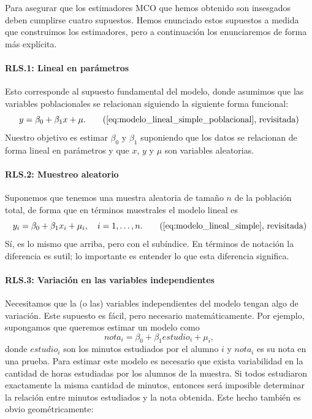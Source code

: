 \documentclass[12pt]{report}\usepackage[]{graphicx}\usepackage[]{color}
\begin{document}
Para asegurar que los estimadores MCO que hemos obtenido son insesgados deben cumplirse cuatro supuestos.
Hemos enunciado estos supuestos a medida que construimos los estimadores, pero a continuación los enunciaremos de forma más explícita.

\paragraph{RLS.1: Lineal en parámetros} Esto corresponde al supuesto fundamental del modelo, donde asumimos que las variables poblacionales se relacionan siguiendo la siguiente forma funcional:
\begin{equation}
y = \beta_0 + \beta_1 x + \mu. \tag{\ref{eq:modelo_lineal_simple_poblacional}, revisitada}
\end{equation}
Nuestro objetivo es estimar $\beta_0$ y $\beta_1$ suponiendo que los datos se relacionan de forma lineal en parámetros y que $x$, $y$ y $\mu$ son variables aleatorias.

\paragraph{RLS.2: Muestreo aleatorio} Suponemos que tenemos una muestra aleatoria de tamaño $n$ de la población total, de forma que en términos muestrales el modelo lineal es
\begin{equation}
y_i = \beta_0 + \beta_1 x_i + \mu_i, \quad i = 1,\ldots,n. \tag{\ref{eq:modelo_lineal_simple}, revisitada}
\end{equation}
Sí, es lo mismo que arriba, pero con el subíndice. En términos de notación la diferencia es sutil; lo importante es entender lo que esta diferencia significa.

\paragraph{RLS.3: Variación en las variables independientes}
Necesitamos que la (o las) variables independientes del modelo tengan algo de variación.
Este supuesto es fácil, pero necesario matemáticamente.
Por ejemplo, supongamos que queremos estimar un modelo como
\begin{equation*}
nota_i = \beta_0 + \beta_1 estudio_i + \mu_i,
\end{equation*}
donde $estudio_i$ son los minutos estudiados por el alumno $i$ y $nota_i$ es su nota en una prueba.
Para estimar este modelo es necesario que exista variabilidad en la cantidad de horas estudiadas por los alumnos de la muestra. Si todos estudiaron exactamente la misma cantidad de minutos, entonces será imposible determinar la relación entre minutos estudiados y la nota obtenida. Este hecho también es obvio geométricamente:
\end{document}
